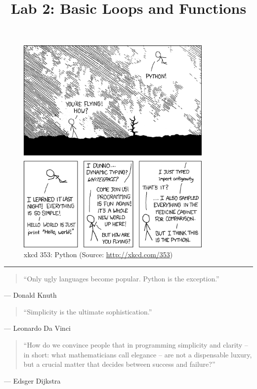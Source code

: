 \documentclass[11pt]{cselabheader}
\title{Lab 2: Basic Loops and Functions}
\begin{document}
\maketitle

\begin{figure}[H]
  \centering
  \includegraphics[width=0.85\textwidth]{img/xkcd_python.png}
  \caption{xkcd 353: Python (Source: \url{http://xkcd.com/353})}
\end{figure}

\pagebreak
\hrule
\begin{quotation}
``Only ugly languages become popular. Python is the exception.''
\end{quotation}
\begin{flushright}
  --- Donald Knuth
\end{flushright}

\begin{quotation}
``Simplicity is the ultimate sophistication.''
\end{quotation}
\begin{flushright}
--- Leonardo Da Vinci
\end{flushright}

\begin{quotation}
``How do we convince people that in programming simplicity and clarity -- in
short: what mathematicians call elegance -- are not a dispensable luxury, but
a crucial matter that decides between success and failure?''
\end{quotation}
\begin{flushright}
--- Edsger Dijkstra
\end{flushright}
\end{document}
